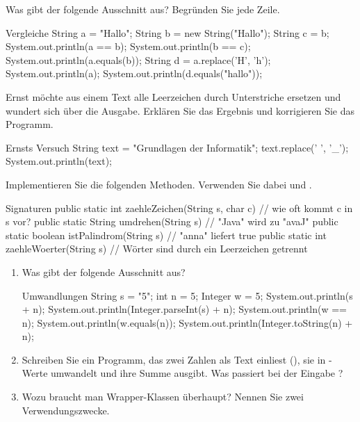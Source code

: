 Was gibt der folgende Ausschnitt aus? Begründen Sie jede Zeile.
\begin{javacode}[Ausschnitt]{Vergleiche}
String a = "Hallo";
String b = new String("Hallo");
String c = b;
System.out.println(a == b);
System.out.println(b == c);
System.out.println(a.equals(b));
String d = a.replace('H', 'h');
System.out.println(a);
System.out.println(d.equals("hallo"));
\end{javacode}

Ernst möchte aus einem Text alle Leerzeichen durch Unterstriche ersetzen und wundert sich über die Ausgabe. Erklären Sie das Ergebnis und korrigieren Sie das Programm.
\begin{javacode}[Ausschnitt]{Ernsts Versuch}
String text = "Grundlagen der Informatik";
text.replace(' ', '_');
System.out.println(text);
\end{javacode}

Implementieren Sie die folgenden Methoden. Verwenden Sie dabei  und .
\begin{javacode}[Ausschnitt]{Signaturen}
public static int zaehleZeichen(String s, char c)       // wie oft kommt c in s vor?
public static String umdrehen(String s)                 // "Java" wird zu "avaJ"
public static boolean istPalindrom(String s)            // "anna" liefert true
public static int zaehleWoerter(String s)               // Wörter sind durch ein Leerzeichen getrennt
\end{javacode}

\begin{enumerate}[label=\alph*)]
\item Was gibt der folgende Ausschnitt aus?
\begin{javacode}[Ausschnitt]{Umwandlungen}
String s = "5";
int n = 5;
Integer w = 5;
System.out.println(s + n);
System.out.println(Integer.parseInt(s) + n);
System.out.println(w == n);
System.out.println(w.equals(n));
System.out.println(Integer.toString(n) + n);
\end{javacode}
\item Schreiben Sie ein Programm, das zwei Zahlen als Text einliest (), sie in -Werte umwandelt und ihre Summe ausgibt. Was passiert bei der Eingabe ?
\item Wozu braucht man Wrapper-Klassen überhaupt? Nennen Sie zwei Verwendungszwecke.
\end{enumerate}

